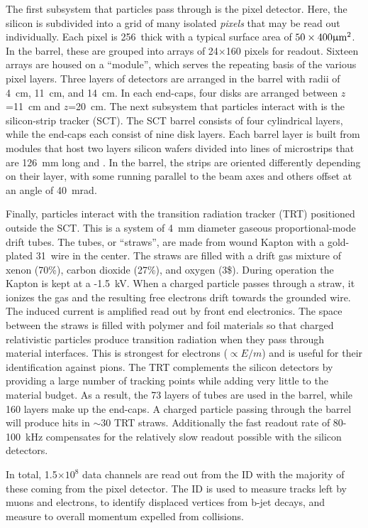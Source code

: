 The first subsystem that particles pass through is the pixel detector.
Here, the silicon is subdivided into a grid of many isolated \emph{pixels} that may be read out individually.
Each pixel is 256~\um thick with a typical surface area of $50\times400\upmu\text{m}^2$.
In the barrel, these are grouped into arrays of 24$\times$160 pixels for readout.
Sixteen arrays are housed on a ``module'', which serves the repeating basis of the various pixel layers.
Three layers of detectors are arranged in the barrel with radii of 4~cm, 11~cm, and 14~cm.
In each end-caps, four disks are arranged between $z$=11~cm and $z$=20~cm.
\cite{pixel}
The next subsystem that particles interact with is the silicon-strip tracker (SCT).
The SCT barrel consists of four cylindrical layers, while the end-caps each consist of nine disk layers.
Each barrel layer is built from modules that host two layers silicon wafers divided into lines of microstrips that are 126~mm long and .
In the barrel, the strips are oriented differently depending on their layer, with some running parallel to the beam axes and others offset at an angle of 40~mrad. \cite{sct}

Finally, particles interact with the transition radiation tracker (TRT) positioned outside the SCT.
This is a system of 4~mm diameter gaseous proportional-mode drift tubes.
The tubes, or ``straws'', are made from wound Kapton with a gold-plated 31~\um wire in the center.
The straws are filled with a drift gas mixture of xenon (70\%), carbon dioxide (27\%), and oxygen (3\$).
During operation the Kapton is kept at a -1.5~kV.
When a charged particle passes through a straw, it ionizes the gas and the resulting free electrons drift towards the grounded wire.
The induced current is amplified read out by front end electronics.
The space between the straws is filled with polymer and foil materials so that charged relativistic particles produce transition radiation when they pass through material interfaces.
This is strongest for electrons ($\propto E/m$) and is useful for their identification against pions.
The TRT complements the silicon detectors by providing a large number of tracking points while adding very little to the material budget.
As a result, the 73 layers of tubes are used in the barrel, while 160 layers make up the end-caps.
A charged particle passing through the barrel will produce hits in $\sim30$ TRT straws.
Additionally the fast readout rate of 80-100~kHz compensates for the relatively slow readout possible with the silicon detectors.
\cite{trt} 

In total, 1.5$\times10^{8}$ data channels are read out from the ID with the majority of these coming from the pixel detector.
The ID is used to measure tracks left by muons and electrons, to identify displaced vertices from b-jet decays, and measure to overall momentum expelled from collisions.

